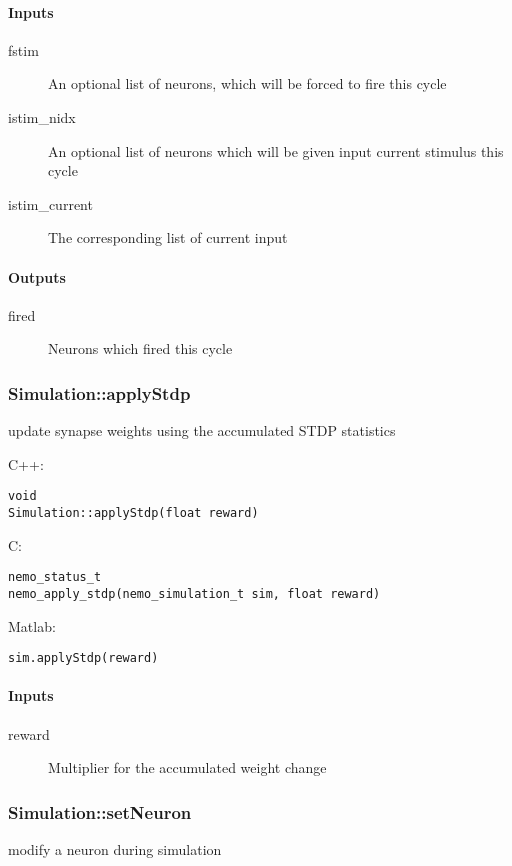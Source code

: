 \paragraph{Inputs}
\begin{description}
\item[fstim] An optional list of neurons, which will be forced to fire this cycle
\item[istim\_nidx] An optional list of neurons which will be given input current stimulus this cycle
\item[istim\_current] The corresponding list of current input
\end{description}
\paragraph{Outputs}
\begin{description}
\item[fired] Neurons which fired this cycle
\end{description}

\clearpage
\subsubsection*{Simulation::applyStdp}
\label{fn: applyStdp}
update synapse weights using the accumulated STDP statistics


\noindent C++:
\begin{lstlisting}[aboveskip=2pt]
void
Simulation::applyStdp(float reward)
\end{lstlisting}

\noindent C:
\begin{lstlisting}[aboveskip=2pt]
nemo_status_t
nemo_apply_stdp(nemo_simulation_t sim, float reward)
\end{lstlisting}

\noindent Matlab:
\begin{lstlisting}[aboveskip=2pt]
sim.applyStdp(reward)
\end{lstlisting}
\paragraph{Inputs}
\begin{description}
\item[reward] Multiplier for the accumulated weight change
\end{description}

\clearpage
\subsubsection*{Simulation::setNeuron}
\label{fn: setNeuron}
modify a neuron during simulation



